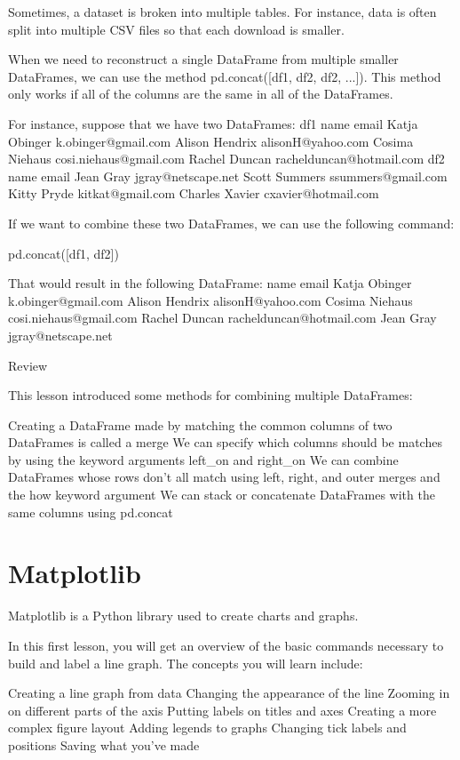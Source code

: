 \documentclass{journal}
\begin{document}
Sometimes, a dataset is broken into multiple tables. For instance, data is often split into multiple CSV files so that each download is smaller.

When we need to reconstruct a single DataFrame from multiple smaller DataFrames, we can use the method pd.concat([df1, df2, df2, ...]). This method only works if all of the columns are the same in all of the DataFrames.

For instance, suppose that we have two DataFrames:
df1
name	email
Katja Obinger	k.obinger@gmail.com
Alison Hendrix	alisonH@yahoo.com
Cosima Niehaus	cosi.niehaus@gmail.com
Rachel Duncan	rachelduncan@hotmail.com
df2
name	email
Jean Gray	jgray@netscape.net
Scott Summers	ssummers@gmail.com
Kitty Pryde	kitkat@gmail.com
Charles Xavier	cxavier@hotmail.com

If we want to combine these two DataFrames, we can use the following command:

pd.concat([df1, df2])

That would result in the following DataFrame:
name	email
Katja Obinger	k.obinger@gmail.com
Alison Hendrix	alisonH@yahoo.com
Cosima Niehaus	cosi.niehaus@gmail.com
Rachel Duncan	rachelduncan@hotmail.com
Jean Gray	jgray@netscape.net

Review

This lesson introduced some methods for combining multiple DataFrames:

    Creating a DataFrame made by matching the common columns of two DataFrames is called a merge
    We can specify which columns should be matches by using the keyword arguments left_on and right_on
    We can combine DataFrames whose rows don’t all match using left, right, and outer merges and the how keyword argument
    We can stack or concatenate DataFrames with the same columns using pd.concat

\section{Matplotlib}
Matplotlib is a Python library used to create charts and graphs.

In this first lesson, you will get an overview of the basic commands necessary to build and label a line graph. The concepts you will learn include:

    Creating a line graph from data
    Changing the appearance of the line
    Zooming in on different parts of the axis
    Putting labels on titles and axes
    Creating a more complex figure layout
    Adding legends to graphs
    Changing tick labels and positions
    Saving what you’ve made
\end{document}

